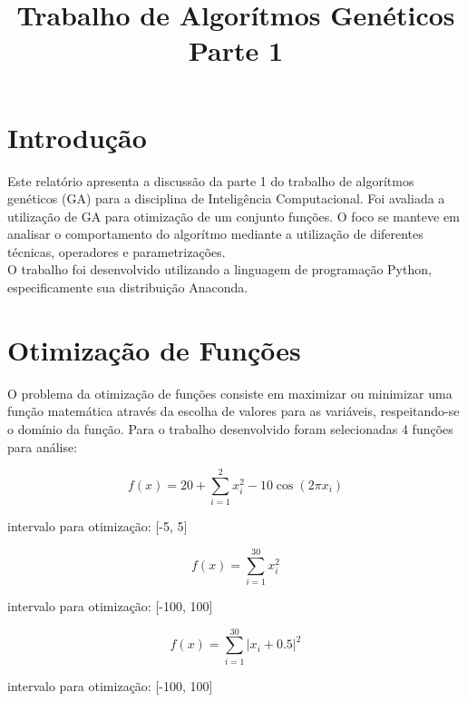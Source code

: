 \documentclass[conference]{IEEEtran}
\begin{document}
\title{Trabalho de Algorítmos Genéticos\\ Parte 1}


\author{
}

\maketitle


\section{Introdução}
Este relatório apresenta a discussão da parte 1 do trabalho de algorítmos
genéticos (GA) para a disciplina de Inteligência Computacional. Foi avaliada a
utilização de GA para otimização de um conjunto funções. O foco se manteve em
analisar o comportamento do algorítmo mediante a utilização de
diferentes técnicas, operadores e parametrizações.\\
O trabalho foi desenvolvido utilizando a linguagem de programação Python,
especificamente sua distribuição Anaconda.\\


\section{Otimização de Funções}
O problema da otimização de funções consiste em maximizar ou minimizar uma 
função matemática através da escolha de valores para as variáveis,
respeitando-se o domínio da função.
Para o trabalho desenvolvido foram selecionadas 4 funções para análise:

\[f(x) = 20 + \sum_{i=1}^{2} x_{i}^{2} - 10\cos(2\pi x_i)\]
\begin{center}intervalo para otimização: [-5, 5]\\\end{center}

\[f(x) = \sum_{i=1}^{30} x_{i}^{2}\]
\begin{center}intervalo para otimização: [-100, 100]\\\end{center}

\[f(x) = \sum_{i=1}^{30} \left|x_i + 0.5\right|^{2}\]
\begin{center}intervalo para otimização: [-100, 100]\\\end{center}
\end{document}
